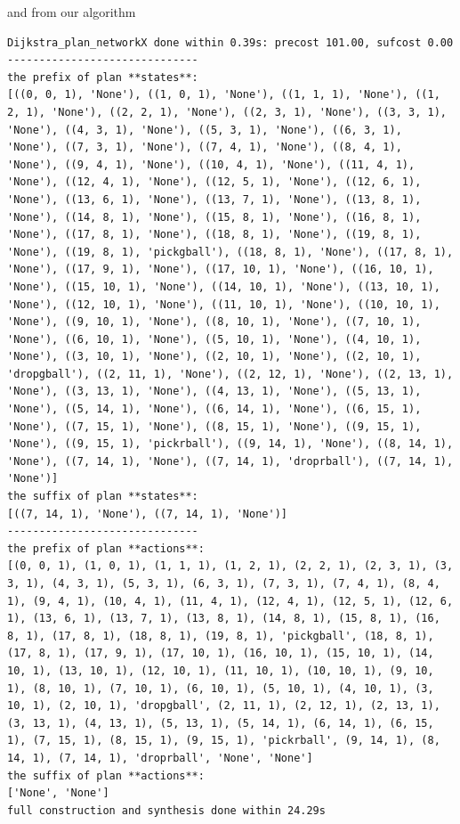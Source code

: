 and from our algorithm
\begin{lstlisting}
Dijkstra_plan_networkX done within 0.39s: precost 101.00, sufcost 0.00
------------------------------
the prefix of plan **states**:
[((0, 0, 1), 'None'), ((1, 0, 1), 'None'), ((1, 1, 1), 'None'), ((1, 2, 1), 'None'), ((2, 2, 1), 'None'), ((2, 3, 1), 'None'), ((3, 3, 1), 'None'), ((4, 3, 1), 'None'), ((5, 3, 1), 'None'), ((6, 3, 1), 'None'), ((7, 3, 1), 'None'), ((7, 4, 1), 'None'), ((8, 4, 1), 'None'), ((9, 4, 1), 'None'), ((10, 4, 1), 'None'), ((11, 4, 1), 'None'), ((12, 4, 1), 'None'), ((12, 5, 1), 'None'), ((12, 6, 1), 'None'), ((13, 6, 1), 'None'), ((13, 7, 1), 'None'), ((13, 8, 1), 'None'), ((14, 8, 1), 'None'), ((15, 8, 1), 'None'), ((16, 8, 1), 'None'), ((17, 8, 1), 'None'), ((18, 8, 1), 'None'), ((19, 8, 1), 'None'), ((19, 8, 1), 'pickgball'), ((18, 8, 1), 'None'), ((17, 8, 1), 'None'), ((17, 9, 1), 'None'), ((17, 10, 1), 'None'), ((16, 10, 1), 'None'), ((15, 10, 1), 'None'), ((14, 10, 1), 'None'), ((13, 10, 1), 'None'), ((12, 10, 1), 'None'), ((11, 10, 1), 'None'), ((10, 10, 1), 'None'), ((9, 10, 1), 'None'), ((8, 10, 1), 'None'), ((7, 10, 1), 'None'), ((6, 10, 1), 'None'), ((5, 10, 1), 'None'), ((4, 10, 1), 'None'), ((3, 10, 1), 'None'), ((2, 10, 1), 'None'), ((2, 10, 1), 'dropgball'), ((2, 11, 1), 'None'), ((2, 12, 1), 'None'), ((2, 13, 1), 'None'), ((3, 13, 1), 'None'), ((4, 13, 1), 'None'), ((5, 13, 1), 'None'), ((5, 14, 1), 'None'), ((6, 14, 1), 'None'), ((6, 15, 1), 'None'), ((7, 15, 1), 'None'), ((8, 15, 1), 'None'), ((9, 15, 1), 'None'), ((9, 15, 1), 'pickrball'), ((9, 14, 1), 'None'), ((8, 14, 1), 'None'), ((7, 14, 1), 'None'), ((7, 14, 1), 'droprball'), ((7, 14, 1), 'None')]
the suffix of plan **states**:
[((7, 14, 1), 'None'), ((7, 14, 1), 'None')]
------------------------------
the prefix of plan **actions**:
[(0, 0, 1), (1, 0, 1), (1, 1, 1), (1, 2, 1), (2, 2, 1), (2, 3, 1), (3, 3, 1), (4, 3, 1), (5, 3, 1), (6, 3, 1), (7, 3, 1), (7, 4, 1), (8, 4, 1), (9, 4, 1), (10, 4, 1), (11, 4, 1), (12, 4, 1), (12, 5, 1), (12, 6, 1), (13, 6, 1), (13, 7, 1), (13, 8, 1), (14, 8, 1), (15, 8, 1), (16, 8, 1), (17, 8, 1), (18, 8, 1), (19, 8, 1), 'pickgball', (18, 8, 1), (17, 8, 1), (17, 9, 1), (17, 10, 1), (16, 10, 1), (15, 10, 1), (14, 10, 1), (13, 10, 1), (12, 10, 1), (11, 10, 1), (10, 10, 1), (9, 10, 1), (8, 10, 1), (7, 10, 1), (6, 10, 1), (5, 10, 1), (4, 10, 1), (3, 10, 1), (2, 10, 1), 'dropgball', (2, 11, 1), (2, 12, 1), (2, 13, 1), (3, 13, 1), (4, 13, 1), (5, 13, 1), (5, 14, 1), (6, 14, 1), (6, 15, 1), (7, 15, 1), (8, 15, 1), (9, 15, 1), 'pickrball', (9, 14, 1), (8, 14, 1), (7, 14, 1), 'droprball', 'None', 'None']
the suffix of plan **actions**:
['None', 'None']
full construction and synthesis done within 24.29s 
\end{lstlisting} 

